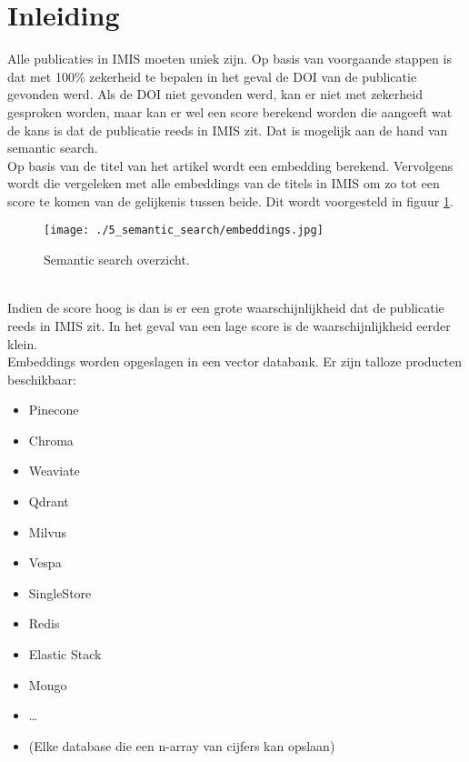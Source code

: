 \section{Inleiding}
Alle publicaties in IMIS moeten uniek zijn. Op basis van voorgaande stappen is dat met 100\% zekerheid te bepalen in het geval de DOI van de publicatie gevonden werd.
Als de DOI niet gevonden werd, kan er niet met zekerheid gesproken worden, maar kan er wel een score berekend worden die aangeeft wat de kans is dat de publicatie reeds in IMIS zit. Dat is mogelijk aan de hand van semantic search.\\
Op basis van de titel van het artikel wordt een embedding berekend. Vervolgens wordt die vergeleken met alle embeddings van de titels in IMIS om zo tot een score te komen van de gelijkenis tussen beide. Dit wordt voorgesteld in figuur \ref{fig:Semanticsearch}.
\begin{figure}
    \centering
    \texttt{[image: ./5\_semantic\_search/embeddings.jpg]}
    \caption[Semantic search.]{\label{fig:Semanticsearch}Semantic search overzicht.}
\end{figure}
\\
Indien de score hoog is dan is er een grote waarschijnlijkheid dat de publicatie reeds in IMIS zit. In het geval van een lage score is de waarschijnlijkheid eerder klein.\\
Embeddings worden opgeslagen in een vector databank. Er zijn talloze producten beschikbaar:
\begin{itemize}
    \item Pinecone
    \item Chroma
    \item Weaviate
    \item Qdrant
    \item Milvus
    \item Vespa
    \item SingleStore
    \item Redis
    \item Elastic Stack
    \item Mongo
    \item …
    \item (Elke database die een n-array van cijfers kan opslaan)
\end{itemize}

